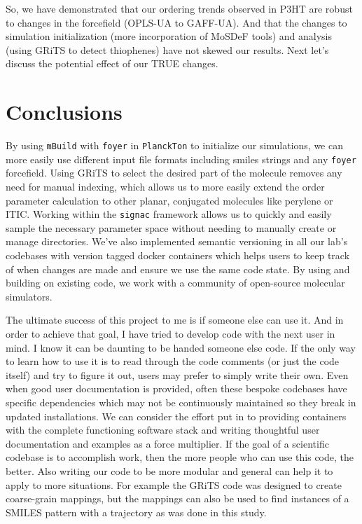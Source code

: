 So, we have demonstrated that our ordering trends observed in P3HT are robust to changes in the forcefield (OPLS-UA to GAFF-UA). And that the changes to simulation initialization (more incorporation of MoSDeF tools) and analysis (using GRiTS to detect thiophenes) have not skewed our results. Next let's discuss the potential effect of our TRUE changes.

\section{Conclusions}

By using  \texttt{mBuild} with \texttt{foyer} in \texttt{PlanckTon} to initialize our simulations, we can more easily use different input file formats including smiles strings and any \texttt{foyer} forcefield. 
Using GRiTS to select the desired part of the molecule removes any need for manual indexing, which allows us to more easily extend the order parameter calculation to other planar, conjugated molecules like perylene or ITIC.
Working within the \texttt{signac} framework allows us to quickly and easily sample the necessary parameter space without needing to manually create or manage directories. 
We've also implemented semantic versioning in all our lab's codebases with version tagged docker containers which helps users to keep track of when changes are made and ensure we use the same code state.
By using and building on existing code, we work with a community of open-source molecular simulators. 

The ultimate success of this project to me is if someone else can use it. 
And in order to achieve that goal, I have tried to develop code with the next user in mind.
I know it can be daunting to be handed someone else code. 
If the only way to learn how to use it is to read through the code comments (or just the code itself) and try to figure it out, users may prefer to simply write their own. 
Even when good user documentation is provided, often these bespoke codebases have specific dependencies which may not be continuously maintained so they break in updated installations.
We can consider the effort put in to providing containers with the complete functioning software stack and writing thoughtful user documentation and examples as a force multiplier. 
If the goal of a scientific codebase is to accomplish work, then the more people who can use this code, the better.
Also writing our code to be more modular and general can help it to apply to more situations. 
For example the GRiTS code was designed to create coarse-grain mappings, but the mappings can also be used to find instances of a SMILES pattern with a trajectory as was done in this study.

